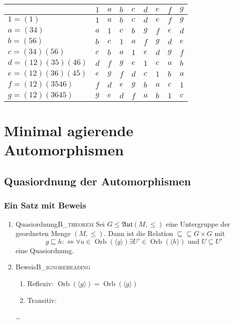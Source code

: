 \documentclass[presentation,t]{beamer}
\DeclareMathOperator\Orb{Orb}%
\begin{document}
\begin{enumerate}
\begin{enumerate}
\begin{center}
\begin{tabular}{lllllllll}
\hline
 & \(1\) & \(a\) & \(b\) & \(c\) & \(d\) & \(e\) & \(f\) & \(g\)\\
\hline
\(1=(1)\) & \(1\) & \(a\) & \(b\) & \(c\) & \(d\) & \(e\) & \(f\) & \(g\)\\
\(a=(34)\) & \(a\) & \(1\) & \(c\) & \(b\) & \(g\) & \(f\) & \(e\) & \(d\)\\
\(b=(56)\) & \(b\) & \(c\) & \(1\) & \(a\) & \(f\) & \(g\) & \(d\) & \(e\)\\
\(c=(34)(56)\) & \(c\) & \(b\) & \(a\) & \(1\) & \(e\) & \(d\) & \(g\) & \(f\)\\
\(d=(12)(35)(46)\) & \(d\) & \(f\) & \(g\) & \(e\) & \(1\) & \(c\) & \(a\) & \(b\)\\
\(e=(12)(36)(45)\) & \(e\) & \(g\) & \(f\) & \(d\) & \(c\) & \(1\) & \(b\) & \(a\)\\
\(f=(12)(3546)\) & \(f\) & \(d\) & \(e\) & \(g\) & \(b\) & \(a\) & \(c\) & \(1\)\\
\(g=(12)(3645)\) & \(g\) & \(e\) & \(d\) & \(f\) & \(a\) & \(b\) & \(1\) & \(c\)\\
\hline
\end{tabular}
\end{center}
\end{enumerate}
\end{enumerate}


\section{Minimal agierende Automorphismen}
\label{sec:org1a35f44}
\subsection{Quasiordnung der Automorphismen}
\label{sec:org5b03f63}
\subsubsection{Ein Satz mit Beweis}
\label{sec:orgd69eefa}
\begin{enumerate}
\item Quasiordnung\hfill{}\textsc{B\_theorem}
\label{sec:orgc3a2e82}
Sei \(G\leq \mathfrak{Aut}(M,\leq)\) eine Untergruppe der geordneten
Menge \((M,\leq)\). Dann ist die Relation \({\sqsubseteq}\subseteq
G\times G\) mit 
\[
g\sqsubseteq h :\Leftrightarrow ∀u∈\Orb(〈g〉)∃U'∈\Orb(〈h〉)\text{ und }U\subseteq U'
\]
eine Quasiordnung.

\item Beweis\hfill{}\textsc{B\_ignoreheading}
\label{sec:orge7a4294}
\begin{enumerate}
\item Reflexiv: \(\Orb(〈g〉) = \Orb(〈g〉)\)
\item Transitiv:
\end{enumerate}
\dots
\end{enumerate}
\end{document}
